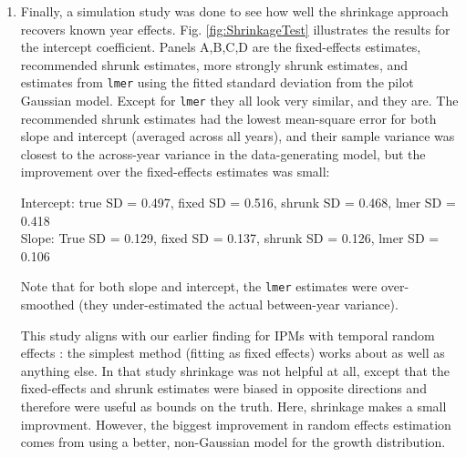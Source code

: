 \documentclass[12pt]{article}
\begin{document}
\begin{enumerate}
\item Finally, a simulation study was done to see how well the shrinkage approach recovers known year effects. Fig. \ref{fig:ShrinkageTest}
illustrates the results for the intercept coefficient. Panels A,B,C,D are the fixed-effects estimates, recommended shrunk estimates,
more strongly shrunk estimates, and estimates from \texttt{lmer} using the fitted standard deviation from the pilot Gaussian model. 
Except for \texttt{lmer} they all look very similar, and they are. The recommended shrunk estimates had the lowest 
mean-square error for both slope and intercept (averaged across all years), and their sample variance was closest to the across-year 
variance in the data-generating model, but the improvement over the fixed-effects estimates was small: 

Intercept: true SD =  0.497, fixed SD =  0.516, shrunk SD = 0.468, lmer SD =  0.418 \\
Slope: True SD =  0.129, fixed SD = 0.137, shrunk SD = 0.126,  lmer SD = 0.106
 
Note that for both slope and intercept, the \texttt{lmer} estimates were over-smoothed (they under-estimated the
actual between-year variance). 

This study aligns with our earlier finding for IPMs with temporal random effects \citep{metcalf-etal-2015}: the simplest method (fitting as
fixed effects) works about as well as anything else. In that study shrinkage was not helpful at all, except that the fixed-effects 
and shrunk estimates were biased in opposite directions and therefore were useful as bounds on the truth. Here, shrinkage 
makes a small improvment. However, the biggest improvement in random effects estimation 
comes from using a better, non-Gaussian model for the growth distribution.  

\end{enumerate} 


\clearpage 
\end{document}

